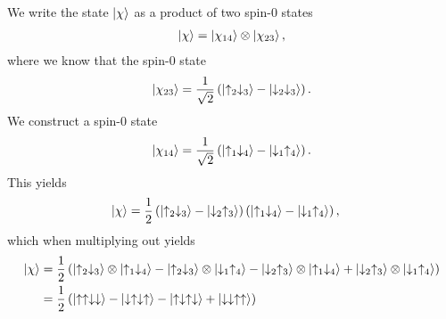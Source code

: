 \documentclass[a4paper,10pt]{article}
\begin{document}
\subsection{ }
We write the state $\ket{\chi}$ as a product of two spin-0 states
%
\begin{align*}
\ket{\chi} = \ket{\chi_{14}} \otimes \ket{\chi_{23}},
\end{align*}
%
where we know that the spin-0 state
%
\begin{align*}
\ket{\chi_{23}} = \frac{1}{\sqrt{2}}\left(\ket{\uparrow_2\downarrow_3} - \ket{\downarrow_2 \downarrow_3}\right).
\end{align*}
%
We construct a spin-0 state
%
\begin{align*}
\ket{\chi_{14}} = \frac{1}{\sqrt{2}}\left(\ket{\uparrow_1 \downarrow_4} - \ket{\downarrow_1 \uparrow_4}\right).
\end{align*}
%
This yields
%
\begin{align*}
\ket{\chi} &= \frac{1}{2}\left(\ket{\uparrow_2\downarrow_3} - \ket{\downarrow_2\uparrow_3}\right)\left(\ket
{\uparrow_1\downarrow_4} - \ket{\downarrow_1\uparrow_4}\right),
\end{align*}
%
which when multiplying out yields
%
\begin{align*}
\ket{\chi} &= \frac{1}{2}\left( \ket{\uparrow_2\downarrow_3} \otimes \ket{\uparrow_1\downarrow_4} - \ket{\uparrow_2 \downarrow_3} \otimes \ket{\downarrow_1\uparrow_4} - \ket{\downarrow_2\uparrow_3} \otimes \ket{\uparrow_1\downarrow_4} + \ket{\downarrow_2\uparrow_3} \otimes \ket{\downarrow_1 \uparrow_4}\right) \\
&= \frac{1}{2}\left( \ket{\uparrow\uparrow\downarrow\downarrow} - \ket{\downarrow\uparrow\downarrow\uparrow} - \ket{\uparrow\downarrow\uparrow\downarrow} + \ket{\downarrow\downarrow\uparrow\uparrow}\right)
\end{align*}
\end{document}
